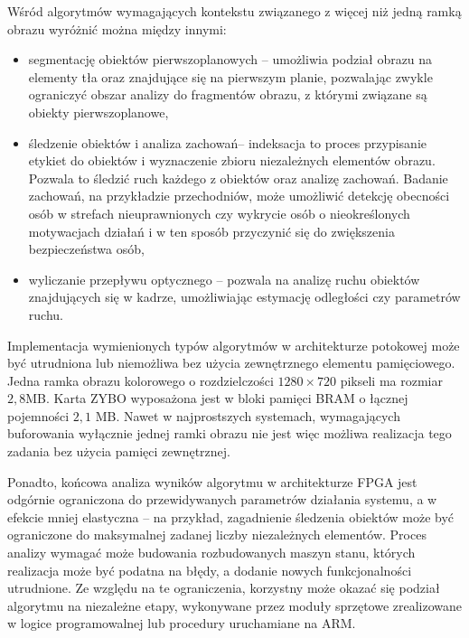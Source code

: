 Wśród algorytmów wymagających kontekstu związanego z więcej niż jedną ramką obrazu wyróżnić można między innymi:
\begin{itemize}
	\item segmentację obiektów pierwszoplanowych -- umożliwia podział obrazu na elementy tła oraz znajdujące się na pierwszym planie, pozwalając zwykle ograniczyć obszar analizy do fragmentów obrazu, z którymi związane są obiekty pierwszoplanowe,

	\item śledzenie obiektów i analiza zachowań-- indeksacja to proces przypisanie etykiet do obiektów i wyznaczenie zbioru niezależnych elementów obrazu. Pozwala to śledzić ruch każdego z obiektów oraz analizę zachowań. Badanie zachowań, na przykładzie przechodniów, może umożliwić detekcję obecności osób w strefach nieuprawnionych czy wykrycie osób o nieokreślonych motywacjach działań i w ten sposób przyczynić się do zwiększenia bezpieczeństwa osób,
	
	\item wyliczanie przepływu optycznego -- pozwala na analizę ruchu obiektów znajdujących się w kadrze, umożliwiając estymację odległości czy parametrów ruchu. %
	
\end{itemize}

Implementacja wymienionych typów algorytmów w architekturze potokowej może być utrudniona lub niemożliwa bez użycia zewnętrznego elementu pamięciowego. %
Jedna ramka obrazu kolorowego o rozdzielczości $1280 \times 720$ pikseli ma rozmiar $2,8$MB. Karta ZYBO wyposażona jest w bloki pamięci BRAM o łącznej pojemności $2,1$ MB. Nawet w najprostszych systemach, wymagających buforowania wyłącznie jednej ramki obrazu nie jest więc możliwa realizacja tego zadania bez użycia pamięci zewnętrznej.

Ponadto, końcowa analiza wyników algorytmu w architekturze FPGA jest odgórnie ograniczona do przewidywanych parametrów działania systemu, a w efekcie mniej elastyczna -- na przykład, zagadnienie śledzenia obiektów może być ograniczone do maksymalnej zadanej liczby niezależnych elementów. Proces analizy wymagać może budowania rozbudowanych maszyn stanu, których realizacja może być podatna na błędy, a dodanie nowych funkcjonalności utrudnione.
Ze względu na te ograniczenia, korzystny może okazać się podział algorytmu na niezależne etapy, wykonywane przez moduły sprzętowe zrealizowane w logice programowalnej lub procedury uruchamiane na ARM.  %

